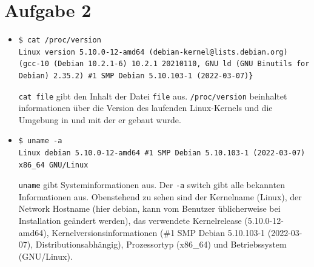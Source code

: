\documentclass{article}
\begin{document}
\section*{Aufgabe 2}

\begin{itemize}
    \item \begin{lstlisting}[breaklines]
$ cat /proc/version
Linux version 5.10.0-12-amd64 (debian-kernel@lists.debian.org) (gcc-10 (Debian 10.2.1-6) 10.2.1 20210110, GNU ld (GNU Binutils for Debian) 2.35.2) #1 SMP Debian 5.10.103-1 (2022-03-07)}
    \end{lstlisting}

    \texttt{cat file} gibt den Inhalt der Datei \texttt{file} aus. \texttt{/proc/version} beinhaltet informationen über die Version des laufenden Linux-Kernels und die Umgebung in und mit der er gebaut wurde.

    \item \begin{lstlisting}[breaklines]
$ uname -a
Linux debian 5.10.0-12-amd64 #1 SMP Debian 5.10.103-1 (2022-03-07) x86_64 GNU/Linux
    \end{lstlisting}

    \texttt{uname} gibt Systeminformationen aus. Der \texttt{-a} switch gibt alle bekannten Informationen aus. Obenstehend zu sehen sind der Kernelname (Linux), der Network Hostname (hier debian, kann vom Benutzer üblicherweise bei Installation geändert werden), das verwendete Kernelrelease (5.10.0-12-amd64), Kernelversionsinformationen (\#1 SMP Debian 5.10.103-1 (2022-03-07), Distributionsabhängig), Prozessortyp (x86\_64) und Betriebssystem (GNU/Linux).


\end{itemize}
\end{document}
